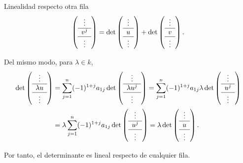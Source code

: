 \begin{frame}[allowframebreaks, t]{Linealidad respecto otra fila}
\begin{multline*}
\left(
\begin{array}{c}
\vdots\\
\hline\\[-12pt]
v^j\\
\hline
\vdots
\end{array}
\right)
=
\det
\left(
\begin{array}{c}
\vdots\\
\hline
u\\
\hline
\vdots
\end{array}
\right)
+
\det
\left(
\begin{array}{c}
\vdots\\
\hline
v\\
\hline
\vdots
\end{array}
\right).
\end{multline*}

\framebreak

Del mismo modo, para \(\lambda\in k\),
\[
\begin{aligned}
\det
\left(
\begin{array}{c}
\vdots\\
\hline
\lambda u\\
\hline
\vdots
\end{array}
\right)
&=
\sum_{j=1}^n
(-1)^{1+j}a_{1j}\det
\left(
\begin{array}{c}
\vdots\\
\hline\\[-12pt]
\lambda u^j\\
\hline
\vdots
\end{array}
\right)=
\sum_{j=1}^n
(-1)^{1+j}a_{1j}\lambda\det
\left(
\begin{array}{c}
\vdots\\
\hline\\[-12pt]
u^j\\
\hline
\vdots
\end{array}
\right)\\
&=
\lambda\sum_{j=1}^n
(-1)^{1+j}a_{1j}\det
\left(
\begin{array}{c}
\vdots\\
\hline\\[-12pt]
u^j\\
\hline
\vdots
\end{array}
\right)
=
\lambda\det
\left(
\begin{array}{c}
\vdots\\
\hline
u\\
\hline
\vdots
\end{array}
\right).
\end{aligned}
\]

Por tanto, el determinante es lineal respecto de cualquier fila.

\end{frame}

